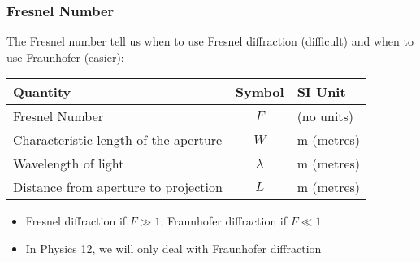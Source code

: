 \documentclass[compress,aspectratio=169]{beamer}
\begin{document}
\begin{frame}
  \frametitle{Fresnel Number}
  The Fresnel number tell us when to use Fresnel diffraction (difficult) and
  when to use Fraunhofer (easier):

  \begin{center}
    \begin{tabular}{l|c|l}
      \rowcolor{pink}
      \textbf{Quantity} & \textbf{Symbol} & \textbf{SI Unit} \\ \hline
      Fresnel Number        & $F$         & (no units) \\
      Characteristic length of the aperture & $W$ & \si{\metre} (metres)\\
      Wavelength of light   & $\lambda$           & \si{\metre} (metres)\\
      Distance from aperture to projection & $L$  & \si{\metre} (metres)\\
    \end{tabular}
  \end{center}

  \begin{itemize}
  \item Fresnel diffraction if $F\gg 1$; Fraunhofer diffraction if $F\ll 1$
  \item In Physics 12, we will only deal with Fraunhofer diffraction
  \end{itemize}
\end{frame}
\end{document}
